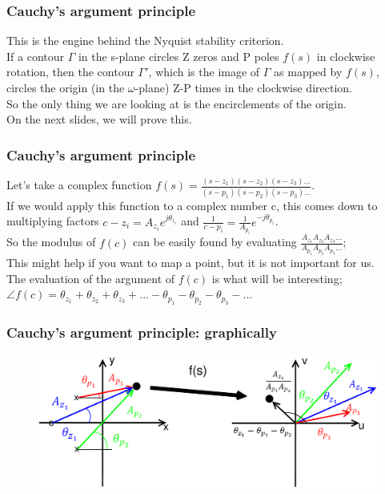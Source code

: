 \begin{frame}
	\frametitle{Cauchy's argument principle}
	\vspace{-7ex}
	This is the engine behind the Nyquist stability criterion.\\
	\medskip
	If a contour $\Gamma$ in the s-plane circles Z zeros and P poles $f(s)$ in clockwise rotation, then the contour $\Gamma'$, which is the image of $\Gamma$ as mapped by $f(s)$, circles the origin (in the $\omega$-plane) Z-P times in the clockwise direction.\\
	\medskip
	So the only thing we are looking at is the encirclements of the origin. \\
	On the next slides, we will prove this.
\end{frame}

\begin{frame}
	\frametitle{Cauchy's argument principle}
	\vspace{-3ex}
	Let's take a complex function $f(s)=\frac{(s-z_1)(s-z_2)(s-z_3)...}{(s-p_1)(s-p_2)(s-p_3)...}$.\\
	\medskip
	If we would apply this function to a complex number c, this comes down to multiplying factors $c-z_i = A_{z_{i}}e^{j\theta_{z_{i}}}$ and $\frac{1}{c-p_i}=\frac{1}{A_{p_{i}}}e^{-j\theta_{p_{i}}}$.\\
	\medskip
	So the modulus of $f(c)$ can be easily found by evaluating $\frac{A_{z_{1}}A_{z_{2}}A_{z_{3}}...}{A_{p_{1}}A_{p_{2}}A_{p_{3}}...}$;\\
	\medskip
	This might help if you want to map a point, but it is not important for us.\\
	\medskip
	The evaluation of the argument of $f(c)$ is what will be interesting; $\angle f(c) = \theta_{z_{1}}+\theta_{z_{2}}+\theta_{z_{3}}+...-\theta_{p_{1}}-\theta_{p_{2}}-\theta_{p_{3}}-...$
\end{frame}

\begin{frame}
	\frametitle{Cauchy's argument principle: graphically}
	\begin{figure}
		\includegraphics[width=1.0\linewidth]{graphical}
	\end{figure}
\end{frame}

